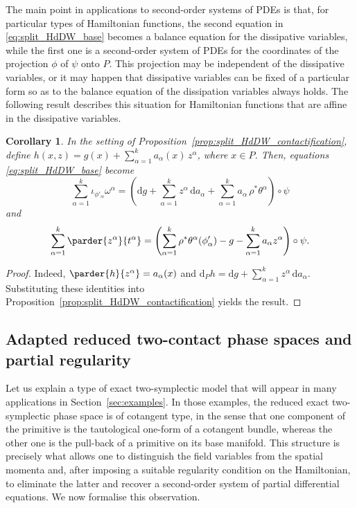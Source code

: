 \documentclass[11pt,a4paper]{article}
\newcommand{\dd}{\mathrm{d}}
\theoremstyle{plain} \newtheorem{theorem}{Theorem}[section] \newtheorem{proposition}[theorem]{Proposition} \newtheorem{corollary}[theorem]{Corollary} \newtheorem{lemma}[theorem]{Lemma} \theoremstyle{definition} \newtheorem{definition}[theorem]{Definition} \theoremstyle{remark} \newtheorem{remark}[theorem]{Remark} \newtheorem{example}[theorem]{Example} %
\begin{document}
The main point in applications to second-order systems of PDEs is that, for particular types of Hamiltonian functions, the second equation in \eqref{eq:split_HdDW_base} becomes a balance equation for the dissipative variables, while the first one is a second-order system of PDEs for the coordinates of the projection $\phi$ of \(\psi\) onto \(P\). This projection may be independent of the dissipative variables,  or it may happen that dissipative variables can be fixed of a particular form so as to the balance equation of the dissipation variables always holds. The following result describes this situation for Hamiltonian functions that are affine in the dissipative variables.
\begin{corollary}\label{cor:affine_dissipative_variables}
In the setting of Proposition~\ref{prop:split_HdDW_contactification}, define \(h(x,z)=g(x)+\sum_{\alpha=1}^k a_\alpha(x)\,z^\alpha\), where \(x\in P\). Then,  equations  \eqref{eq:split_HdDW_base}  become
\begin{equation}\label{eq:split_HdDW_affine_base}
\sum_{\alpha=1}^k \iota_{\phi'_\alpha}\omega^\alpha=\left(\dd g+\sum_{\alpha=1}^k z^\alpha\,\dd a_\alpha+\sum_{\alpha=1}^k a_\alpha\,\rho^*\theta^\alpha\right)\circ\psi
\end{equation}
and
\begin{equation}\label{eq:split_HdDW_affine_diss}
\sum_{\alpha=1}^k \parder{z^\alpha}{t^\alpha}=\left(\sum_{\alpha=1}^k\rho^*\theta^\alpha(\phi'_\alpha)-g-\sum_{\alpha=1}^k a_\alpha z^\alpha\right)\circ\psi.
\end{equation} 
\end{corollary}

\begin{proof}
Indeed, \(\parder{h}{z^\alpha}=a_\alpha(x)\) and \(\dd_P h=\dd g+\sum_{\alpha=1}^k z^\alpha\,\dd a_\alpha\). Substituting these identities into Proposition~\ref{prop:split_HdDW_contactification} yields the result.
\end{proof}

\subsection{Adapted reduced two-contact phase spaces and partial regularity}
Let us explain a type of exact two-symplectic model that will appear in many applications in Section~\ref{sec:examples}. In those examples, the reduced exact two-symplectic phase space is of cotangent type, in the sense that one component of the primitive is the tautological one-form of a cotangent bundle, whereas the other one is the pull-back of a primitive on its base manifold. This structure is precisely what allows one to distinguish the field variables from the spatial momenta and, after imposing a suitable regularity condition on the Hamiltonian, to eliminate the latter and recover a second-order system of partial differential equations. We now formalise this observation.
\end{document}
